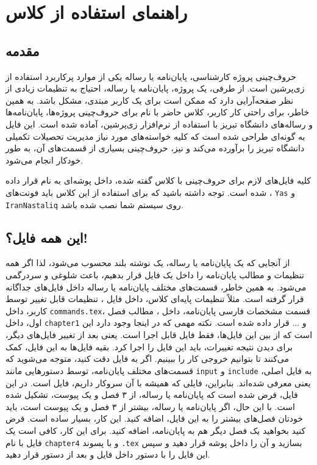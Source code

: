 \chapter{راهنمای استفاده از کلاس}
\thispagestyle{empty}
\section{مقدمه}
حروف‌چینی پروژه کارشناسی، پایان‌نامه یا رساله یکی از موارد پرکاربرد استفاده از زی‌پرشین است. از طرفی، یک پروژه، پایان‌نامه یا رساله،  احتیاج به تنظیمات زیادی از نظر صفحه‌آرایی  دارد که ممکن است برای
یک کاربر مبتدی، مشکل باشد. به همین خاطر، برای راحتی کار کاربر، کلاس حاضر با نام 
 برای حروف‌چینی پروژه‌ها، پایان‌نامه‌ها و رساله‌های دانشگاه تبریز با استفاده از نرم‌افزار زی‌پرشین،  آماده شده است. این فایل به 
گونه‌ای طراحی شده است که کلیه خواسته‌های مورد نیاز  مدیریت تحصیلات تکمیلی دانشگاه تبریز را برآورده می‌کند و نیز، حروف‌چینی بسیاری
از قسمت‌های آن، به طور خودکار انجام می‌شود.

کلیه فایل‌های لازم برای حروف‌چینی با کلاس گفته شده، داخل پوشه‌ای به نام
  قرار داده شده است. توجه داشته باشید که برای استفاده از این کلاس باید فونت‌های
،
 \verb!Yas!
 و
  \verb!IranNastaliq!
    روی سیستم شما نصب شده باشد.
\section{این همه فایل؟!}\label{sec2}
از آنجایی که یک پایان‌نامه یا رساله، یک نوشته بلند محسوب می‌شود، لذا اگر همه تنظیمات و مطالب پایان‌نامه را داخل یک فایل قرار بدهیم، باعث شلوغی
و سردرگمی می‌شود. به همین خاطر، قسمت‌های مختلف پایان‌نامه یا رساله  داخل فایل‌های جداگانه قرار گرفته است. مثلاً تنظیمات پایه‌ای کلاس، داخل فایل
، 
تنظیمات قابل تغییر توسط کاربر، داخل 
\verb!commands.tex!،
قسمت مشخصات فارسی پایان‌نامه، داخل 
،
مطالب فصل اول، داخل 
\verb!chapter1!
و ... قرار داده شده است. نکته مهمی که در اینجا وجود دارد این است که از بین این  فایل‌ها، فقط فایل 
قابل اجرا است. یعنی بعد از تغییر فایل‌های دیگر، برای دیدن نتیجه تغییرات، باید این فایل را اجرا کرد. بقیه فایل‌ها به این فایل، کمک می‌کنند تا بتوانیم خروجی کار را ببینیم. اگر به فایل 
دقت کنید، متوجه می‌شوید که قسمت‌های مختلف پایان‌نامه، توسط دستورهایی مانند 
\verb!input!
و
\verb!include!
به فایل اصلی، یعنی 
معرفی شده‌اند. بنابراین، فایلی که همیشه با آن سروکار داریم، فایل 
است.
در این فایل، فرض شده است که پایان‌نامه یا رساله، از ۳ فصل و یک پیوست، تشکیل شده است. با این حال، اگر
  پایان‌نامه یا رساله، بیشتر از ۳ فصل و یک پیوست است، باید خودتان فصل‌های بیشتر را به این فایل، اضافه کنید. این کار، بسیار ساده است. فرض کنید بخواهید یک فصل دیگر هم به پایان‌نامه، اضافه کنید. برای این کار، کافی است یک فایل با نام 
\verb!chapter4!
و با پسوند 
\verb!.tex!
بسازید و آن را داخل پوشه 
قرار دهید و سپس این فایل را با دستور 
\verb!!
داخل فایل
و بعد از دستور
\verb!!
 قرار دهید.
